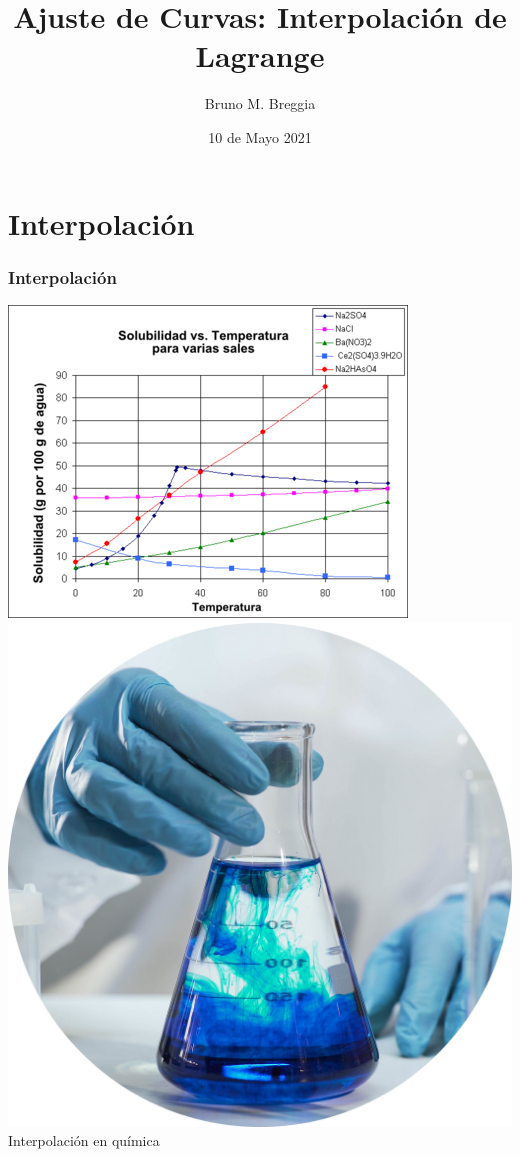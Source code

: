 \documentclass[11pt,xcolor={rgb}]{beamer}
\begin{document}
\title{Ajuste de Curvas: Interpolación de Lagrange}
\author{Bruno M. Breggia}
\date{10 de Mayo 2021}

\begin{frame}[plain]
\titlepage
\end{frame}

\section{Interpolaci\'on}

\begin{frame}
\frametitle{Interpolaci\'on}
\begin{center}
	\includegraphics[scale=.6]{solubilidad}
	\includegraphics[scale=.05]{solucion}
	\vfill
	Interpolaci\'on en qu\'imica
\end{center}
\end{frame}
\end{document}
